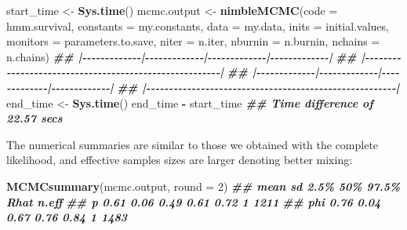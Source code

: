 \documentclass[
  12pt,
]{krantz}
\newenvironment{Shaded}{\begin{snugshade}}{\end{snugshade}}
\newcommand{\AttributeTok}[1]{\textcolor[rgb]{0.13,0.29,0.53}{#1}}
\newcommand{\DecValTok}[1]{\textcolor[rgb]{0.00,0.00,0.81}{#1}}
\newcommand{\DocumentationTok}[1]{\textcolor[rgb]{0.56,0.35,0.01}{\textbf{\textit{#1}}}}
\newcommand{\FunctionTok}[1]{\textcolor[rgb]{0.13,0.29,0.53}{\textbf{#1}}}
\newcommand{\NormalTok}[1]{#1}
\newcommand{\OtherTok}[1]{\textcolor[rgb]{0.56,0.35,0.01}{#1}}
\newcommand{\SpecialCharTok}[1]{\textcolor[rgb]{0.81,0.36,0.00}{\textbf{#1}}}
\begin{document}
\begin{Shaded}
\begin{Highlighting}[]
\NormalTok{start\_time }\OtherTok{\textless{}{-}} \FunctionTok{Sys.time}\NormalTok{()}
\NormalTok{mcmc.output }\OtherTok{\textless{}{-}} \FunctionTok{nimbleMCMC}\NormalTok{(}\AttributeTok{code =}\NormalTok{ hmm.survival,}
                          \AttributeTok{constants =}\NormalTok{ my.constants,}
                          \AttributeTok{data =}\NormalTok{ my.data,}
                          \AttributeTok{inits =}\NormalTok{ initial.values,}
                          \AttributeTok{monitors =}\NormalTok{ parameters.to.save,}
                          \AttributeTok{niter =}\NormalTok{ n.iter,}
                          \AttributeTok{nburnin =}\NormalTok{ n.burnin,}
                          \AttributeTok{nchains =}\NormalTok{ n.chains)}
\DocumentationTok{\#\# |{-}{-}{-}{-}{-}{-}{-}{-}{-}{-}{-}{-}{-}|{-}{-}{-}{-}{-}{-}{-}{-}{-}{-}{-}{-}{-}|{-}{-}{-}{-}{-}{-}{-}{-}{-}{-}{-}{-}{-}|{-}{-}{-}{-}{-}{-}{-}{-}{-}{-}{-}{-}{-}|}
\DocumentationTok{\#\# |{-}{-}{-}{-}{-}{-}{-}{-}{-}{-}{-}{-}{-}{-}{-}{-}{-}{-}{-}{-}{-}{-}{-}{-}{-}{-}{-}{-}{-}{-}{-}{-}{-}{-}{-}{-}{-}{-}{-}{-}{-}{-}{-}{-}{-}{-}{-}{-}{-}{-}{-}{-}{-}{-}{-}|}
\DocumentationTok{\#\# |{-}{-}{-}{-}{-}{-}{-}{-}{-}{-}{-}{-}{-}|{-}{-}{-}{-}{-}{-}{-}{-}{-}{-}{-}{-}{-}|{-}{-}{-}{-}{-}{-}{-}{-}{-}{-}{-}{-}{-}|{-}{-}{-}{-}{-}{-}{-}{-}{-}{-}{-}{-}{-}|}
\DocumentationTok{\#\# |{-}{-}{-}{-}{-}{-}{-}{-}{-}{-}{-}{-}{-}{-}{-}{-}{-}{-}{-}{-}{-}{-}{-}{-}{-}{-}{-}{-}{-}{-}{-}{-}{-}{-}{-}{-}{-}{-}{-}{-}{-}{-}{-}{-}{-}{-}{-}{-}{-}{-}{-}{-}{-}{-}{-}|}
\NormalTok{end\_time }\OtherTok{\textless{}{-}} \FunctionTok{Sys.time}\NormalTok{()}
\NormalTok{end\_time }\SpecialCharTok{{-}}\NormalTok{ start\_time}
\DocumentationTok{\#\# Time difference of 22.57 secs}
\end{Highlighting}
\end{Shaded}

The numerical summaries are similar to those we obtained with the complete likelihood, and effective samples sizes are larger denoting better mixing:

\begin{Shaded}
\begin{Highlighting}[]
\FunctionTok{MCMCsummary}\NormalTok{(mcmc.output, }\AttributeTok{round =} \DecValTok{2}\NormalTok{)}
\DocumentationTok{\#\#     mean   sd 2.5\%  50\% 97.5\% Rhat n.eff}
\DocumentationTok{\#\# p   0.61 0.06 0.49 0.61  0.72    1  1211}
\DocumentationTok{\#\# phi 0.76 0.04 0.67 0.76  0.84    1  1483}
\end{Highlighting}
\end{Shaded}
\end{document}
